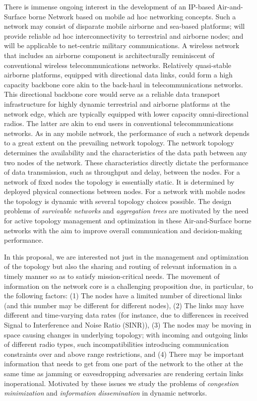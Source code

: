 There is immense ongoing interest in the development of an
IP-based Air-and-Surface borne Network based on mobile ad hoc
networking concepts. Such a network may consist of
disparate mobile airborne and sea-based platforms; will provide reliable ad
hoc interconnectivity to terrestrial and airborne nodes; and
will be applicable to net-centric military communications. A
wireless network that includes an airborne component is
architecturally reminiscent of conventional wireless
telecommunications networks. Relatively quasi-stable
airborne platforms, equipped with directional data links, could
form a high capacity backbone core akin to the back-haul in
telecommunications networks. This directional backbone core
would serve as a reliable data transport infrastructure for
highly dynamic terrestrial and airborne platforms at the
network edge, which are typically equipped with lower
capacity omni-directional radios. The latter are akin to end
users in conventional telecommunications networks.
As in any mobile network, the performance of such a network
depends to a great extent on the prevailing network topology.
The network topology determines the availability and the
characteristics of the data path between any two nodes of the
network. These characteristics directly dictate the performance
of data transmission, such as throughput and delay, between
the nodes. For a network of fixed nodes the topology is
essentially static. It is determined by deployed physical
connections between nodes. For a network with mobile nodes
the topology is dynamic with several topology choices
possible. The design problems of {\em survivable networks}
and {\em aggregation trees}  are motivated by the
need for active topology management and optimization in
these Air-and-Surface borne networks with
the aim to improve overall communication and decision-making performance.

In this proposal, we are interested not just in the management and
optimization of the topology but also the sharing and routing of
relevant information in a timely manner so as to satisfy mission-critical
needs. The movement of information on the network core is a challenging
proposition \cite{hadynski+lrwz} due, in particular, to the following factors: (1) The
nodes have a limited number of  directional links (and this
number may be different for different nodes), (2) The links
may have different and time-varying data rates (for instance, due to differences
in received Signal to Interference and Noise Ratio (SINR)),
(3) The nodes may be moving in space causing changes in underlying topology;
with incoming and outgoing links of different radio
types, such incompatibilities introducing communication constraints over and above
range restrictions, and (4) There may be important information that needs
to get from one part of the network to the other at the same time as
jamming or eavesdropping adversaries are rendering certain links inoperational.
Motivated by these issues we study the problems of {\em congestion
minimization} and {\em information dissemination} in dynamic networks.

